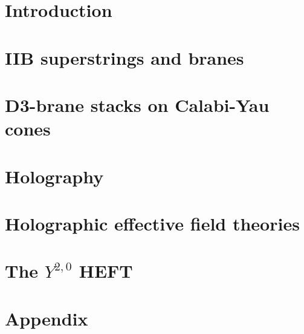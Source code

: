 \documentclass[11pt,a4paper,oneside,openright,titlepage]{book}
\author{Riccardo Antonelli}
\begin{document}
\frontmatter




\setlength{\parskip}{0.2cm} 

\tableofcontents

\mainmatter

\chapter{Introduction}



\chapter{IIB superstrings and branes}



\chapter{D3-brane stacks on Calabi-Yau cones}



\chapter{Holography}



\chapter{Holographic effective field theories}



\chapter{The $Y^{2,0}$ HEFT}

%



\appendix

\chapter{Appendix}




\backmatter



\end{document}
